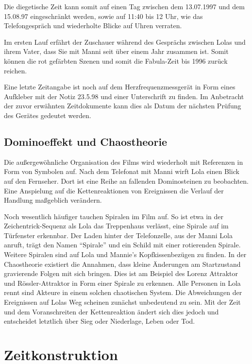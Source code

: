 Die diegetische Zeit kann somit auf einen Tag zwischen dem 13.07.1997 und dem 15.08.97 eingeschränkt werden, sowie auf 11:40 bis 12 Uhr, wie das Telefongespräch und wiederholte Blicke auf Uhren verraten.

Im ersten Lauf erfährt der Zuschauer während des Gesprächs zwischen Lolas und ihrem Vater, dass Sie mit Manni seit über einem Jahr zusammen ist. Somit können die rot gefärbten Szenen und somit die Fabula-Zeit bis 1996 zurück reichen.

Eine letzte Zeitangabe ist noch auf dem Herzfrequenzmessgerät in Form eines Aufkleber mit der Notiz 23.5.98 und einer Unterschrift zu finden. Im Anbetracht der zuvor erwähnten Zeitdokumente kann dies als Datum der nächsten Prüfung des Gerätes gedeutet werden.

\subsection{Dominoeffekt und Chaostheorie}

Die außergewöhnliche Organisation des Films wird wiederholt mit Referenzen in Form von Symbolen auf. Nach dem Telefonat mit Manni wirft Lola einen Blick auf den Fernseher. Dort ist eine Reihe an fallenden Dominosteinen zu beobachten. Eine Anspielung auf die Kettenreaktionen von Ereignissen die Verlauf der Handlung maßgeblich verändern.

Noch wesentlich häufiger tauchen Spiralen im Film auf. So ist etwa in der Zeichentrick-Sequenz als Lola das Treppenhaus verlässt, eine Spirale auf im Türfenster erkennbar. Der Laden hinter der Telefonzelle, aus der Manni Lola anruft, trägt den Namen "`Spirale"' und ein Schild mit einer rotierenden Spirale. Weitere Spiralen sind auf Lola und Mannie's Kopfkissenbezügen zu finden. In der Chaostheorie existiert die Annahmen, dass kleine Änderungen am Startzustand gravierende Folgen mit sich bringen. Dies ist am Beispiel des Lorenz Attraktor und Rössler-Attraktor in Form einer Spirale zu erkennen. Alle Personen in Lola rennt sind Akteure in einem solchen chaotischen System. Die Abweichungen der Ereignissen auf Lolas Weg scheinen zunächst unbedeutend zu sein. Mit der Zeit und dem Voranschreiten der Kettenreaktion ändert sich dies jedoch und entscheidet letztlich über Sieg oder Niederlage, Leben oder Tod.


\section{Zeitkonstruktion}


